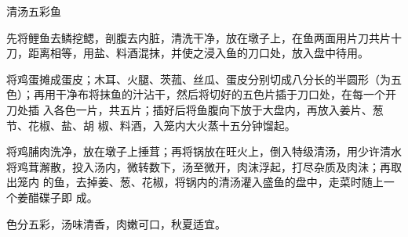 %
%
%
%
%
%
%
\begin{recipe}[麒麟鱼]{清汤五彩鱼}

\ingredients


\preparation

\step 先将鲤鱼去鳞挖鳃，剖腹去内脏，清洗干净，放在墩子上，在鱼两面用片刀共片十
刀，距离相等，用盐、料酒混抹，并使之浸入鱼的刀口处，放入盘中待用。

\step 将鸡蛋摊成蛋皮；木耳、火腿、茨菰、丝瓜、蛋皮分别切成八分长的半圆形（为五
色）；再用干净布将抹鱼的汁沾干，然后将切好的五色片插于刀口处，在每一个开刀处插
入各色一片，共五片；插好后将鱼腹向下放于大盘内，再放入姜片、葱节、花椒、盐、胡
椒、料酒，入笼内大火蒸十五分钟馏起。

\step 将鸡脯肉洗净，放在墩子上捶茸；再将锅放在旺火上，倒入特级清汤，用少许清水
将鸡茸澥散，投入汤内，微转数下，汤至微开，肉沫浮起，打尽杂质及肉沬；再取出笼内
的鱼，去掉姜、葱、花椒，将锅内的清汤灌入盛鱼的盘中，走菜时随上一个姜醋碟子即
成。

\features

色分五彩，汤味清香，肉嫩可口，秋夏适宜。

\end{recipe}

